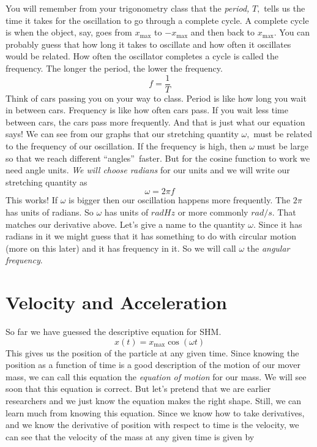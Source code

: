 \documentclass{book}
\begin{document}
You will remember from your trigonometry class that the \emph{period,} $T,$
tells us the time it takes for the oscillation to go through a complete
cycle. A complete cycle is when the object, say, goes from $x_{\max }$ to $%
-x_{\max }$ and then back to $x_{\max }.$ You can probably guess that how
long it takes to oscillate and how often it oscillates would be related. How
often the oscillator completes a cycle is called the frequency. The longer
the period, the lower the frequency. 
\begin{equation*}
f=\frac{1}{T}
\end{equation*}%
Think of cars passing you on your way to class. Period is like how long you
wait in between cars. Frequency is like how often cars pass. If you wait
less time between cars, the cars pass more frequently. And that is just what
our equation says! We can see from our graphs that our stretching quantity $%
\omega ,$ must be related to the frequency of our oscillation. If the
frequency is high, then $\omega $ must be large so that we reach different
\textquotedblleft angles\textquotedblright\ faster. But for the cosine
function to work we need angle units. \emph{We will choose radians} for our
units and we will write our stretching quantity as 
\begin{equation*}
\omega =2\pi f
\end{equation*}%
This works! If $\omega $ is bigger then our oscillation happens more
frequently. The $2\pi $ has units of radians. So $\omega $ has units of $%
\unit{rad}\unit{Hz}$ or more commonly $\unit{rad}/\unit{s}.$ That matches
our derivative above. Let's give a name to the quantity $\omega .$ Since it
has radians in it we might guess that it has something to do with circular
motion (more on this later) and it has frequency in it. So we will call $%
\omega $ the \emph{angular frequency}.

\section{Velocity and Acceleration}

So far we have guessed the descriptive equation for SHM. 
\begin{equation}
x\left( t\right) =x_{\max }\cos \left( \omega t\right)
\end{equation}%
This gives us the position of the particle at any given time. Since knowing
the position as a function of time is a good description of the motion of
our mover mass, we can call this equation the \emph{equation of motion} for
our mass. We will see soon that this equation is correct. But let's pretend
that we are earlier researchers and we just know the equation makes the
right shape. Still, we can learn much from knowing this equation. Since we
know how to take derivatives, and we know the derivative of position with
respect to time is the velocity, we can see that the velocity of the mass at
any given time is given by
\end{document}
